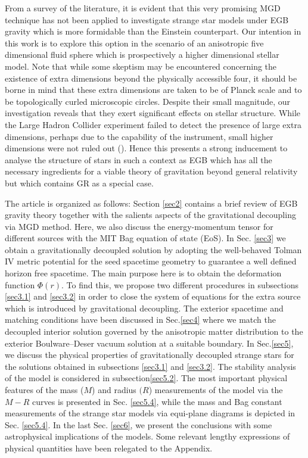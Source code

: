 \documentclass[]{aastex631}
\begin{document}
From a survey of the literature, it is evident that this very promising MGD technique has not been applied to investigate strange star models under EGB gravity which is more formidable than the Einstein counterpart. Our intention in this work is to explore this option in the scenario of an anisotropic five dimensional fluid sphere which is prospectively a higher dimensional stellar model. Note that while some skeptism may be encountered concerning the  existence of extra dimensions beyond the physically accessible four, it should be borne in mind that these extra dimensions are taken to be of Planck scale and to be topologically curled microscopic circles. Despite their small magnitude, our investigation reveals that they exert significant effects on stellar structure. While the Large Hadron Collider experiment failed to detect the presence of large extra dimensions, perhaps due to the capability of the instrument, small higher dimensions were not ruled out (\cite{choudhury}).  Hence this presents a strong inducement to analyse the structure of stars in such a context as EGB which has all the necessary ingredients for a viable theory of gravitation beyond general relativity  but which contains GR as a special case.

The article is organized as follows:  Section \ref{sec2} contains a brief  review of EGB gravity theory together with the salients aspects of the gravitational decoupling via MGD method. Here, we also discuss the energy-momentum tensor for different sources with the MIT Bag equation of state (EoS). In Sec. \ref{sec3} we obtain a gravitationally decoupled solution by adopting the well-behaved Tolman IV metric potential for the seed spacetime geometry
to guarantee a well defined horizon free spacetime.  The main purpose here is to obtain the deformation function $\Phi(r)$. To find this, we propose two different procedures in subsections \ref{sec3.1} and \ref{sec3.2} in order to close the system of equations for the extra  source which is introduced by gravitational decoupling. The exterior spacetime and matching conditions have been discussed in Sec.\ref{sec4} where we match the decoupled interior solution governed by the anisotropic matter distribution to the  exterior Boulware--Deser vacuum  solution at a suitable boundary. In Sec.\ref{sec5}, we discuss the physical properties of gravitationally decoupled strange stars for the  solutions  obtained in subsections \ref{sec3.1} and \ref{sec3.2}. The stability analysis of the model is considered in subsection\ref{sec5.2}. The most important physical features of the mass ($M$) and radius $(R$) measurements of the model via the $M-R$ curves is presented in Sec. \ref{sec5.4}, while the  mass and Bag constant measurements of the strange star models via equi-plane diagrams is depicted in Sec. \ref{sec5.4}. In the last Sec. \ref{sec6}, we present the conclusions with some astrophysical implications of the models.   Some relevant lengthy expressions of physical quantities have been relegated to  the Appendix.  
\end{document}
